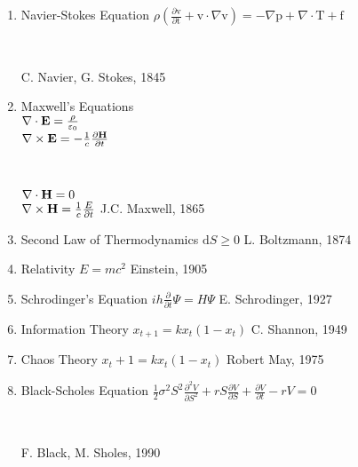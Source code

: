\documentclass{article}
\begin{document}
\begin{enumerate}
\item \begin{minipage}[t]{100mm} Navier-Stokes Equation $\rho(\frac{\partial \mathrm{v}}{\partial \mathrm{t}}+\mathrm{v} \cdot \nabla \mathrm{v}) = - \nabla \mathrm{p} + \nabla \cdot \mathrm{T} + \mathrm{f} $ \end{minipage}\\
 \begin{minipage}[t]{100mm}\hfill C. Navier, G. Stokes, 1845  \end{minipage}
\item  \begin{minipage}[t]{100mm} Maxwell's Equations \\ $\nabla\cdot{\bf E} = \frac{\rho}{\varepsilon_0}$ \\ $\nabla\times{\bf E} = -\frac{1}{c} \frac{\partial{\bf H}}{\partial t}$ \end{minipage} \\
 \begin{minipage}[t]{100mm} $\nabla\cdot{\bf H} = 0$ \\$\nabla\times{\bf H} = \frac{1}{c} \frac {E}{\partial t}$  \hfill J.C. Maxwell, 1865\end{minipage}
\item  \begin{minipage}[t]{100mm} Second Law of Thermodynamics $\mathrm{d}S\ge 0 $ \hfill L. Boltzmann, 1874 \end{minipage}
\item  \begin{minipage}[t]{100mm} Relativity $ E=mc^2 $ \hfill Einstein, 1905 \end{minipage}
\item  \begin{minipage}[t]{100mm} Schrodinger's Equation $ ih \frac{\partial}{\partial t} \Psi = H \Psi $
\hfill E. Schrodinger, 1927 \end{minipage}
\item  \begin{minipage}[t]{100mm} Information Theory $ x_{t+1}=kx_{t}(1-x_{t}) $ \hfill C. Shannon, 1949 \end{minipage}
\item  \begin{minipage}[t]{100mm} Chaos Theory $x_t+1 = kx_t(1-x_t)$ \hfill Robert May, 1975 \end{minipage}
\item  \begin{minipage}[t]{100mm} Black-Scholes Equation $ \frac{1}{2} \sigma^2 S^2 \frac{\partial^2 V}{\partial S^2} + rS \frac{\partial V}{\partial S} + \frac{\partial V}{\partial t} - rV = 0$ \end{minipage} \\
 \begin{minipage}[t]{100mm}\hfill F. Black, M. Sholes, 1990  \end{minipage}
\end{enumerate}
\end{document}
